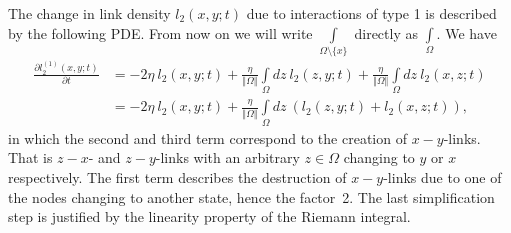The change in link density $l_2(x,y;t)$ due to interactions of type 1 is described by the following PDE. From now on we will write $\int\limits_{\Omega \setminus \{x\}}$ directly as $\int\limits_{ \Omega}$. We have
\begin{equation}
\begin{aligned}
    \frac{\partial l_2^{(1)}(x,y;t)}{\partial t} 
    &= - 2\eta\ l_2(x,y;t) + \frac{\eta}{\Vert \Omega \Vert} \int\limits_{\Omega}dz\ l_2(z,y;t)   + \frac{\eta}{\Vert \Omega \Vert} \int\limits_{\Omega}dz\ l_2(x,z;t)    \\
    &= - 2\eta \ l_2(x,y;t) + \frac{\eta}{\Vert \Omega \Vert} \int\limits_{\Omega}dz\ \left( l_2(z,y;t)   +  l_2(x,z;t) \right)  
    ,
    \label{eq:continuous_pde_link_firsttype}
\end{aligned}
\end{equation}
in which the second and third term correspond to the creation of $x-y$-links. That is $z-x$- and $z-y$-links with an arbitrary $z \in \Omega$ changing to $y$ or $x$ respectively. The first term describes the destruction of $x-y$-links due to one of the nodes changing to another state, hence the factor~2. The last simplification step is justified by the linearity property of the Riemann integral.

